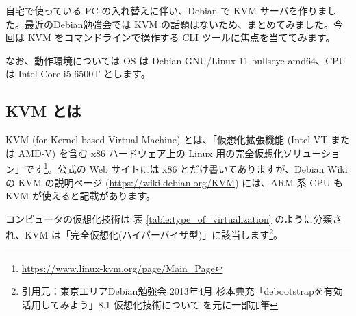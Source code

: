 \documentclass[mingoth,a4paper]{jsarticle}
\begin{document}
自宅で使っている PC の入れ替えに伴い、Debian で KVM サーバを作りました。最近のDebian勉強会では KVM の話題はないため、まとめてみました。今回は KVM をコマンドラインで操作する CLI ツールに焦点を当ててみます。

なお、動作環境については OS は Debian GNU/Linux 11 bullseye amd64、CPU は Intel Core i5-6500T とします。


\subsection{KVM とは}

KVM (for Kernel-based Virtual Machine) とは、「仮想化拡張機能 (Intel VT または AMD-V) を含む x86 ハードウェア上の Linux 用の完全仮想化ソリューション」です\footnote{\url{https://www.linux-kvm.org/page/Main_Page}}。公式の Web サイトには x86 とだけ書いてありますが、Debian Wiki の KVM の説明ページ (\url{https://wiki.debian.org/KVM}) には、ARM 系 CPU も KVM が使えると記載があります。

コンピュータの仮想化技術は 表 \ref{table:type_of_virtualization} のように分類され、KVM は「完全仮想化(ハイパーバイザ型)」に該当します\footnote{引用元：東京エリアDebian勉強会 2013年4月 杉本典充「debootstrapを有効活用してみよう」8.1 仮想化技術について を元に一部加筆}。
\end{document}
